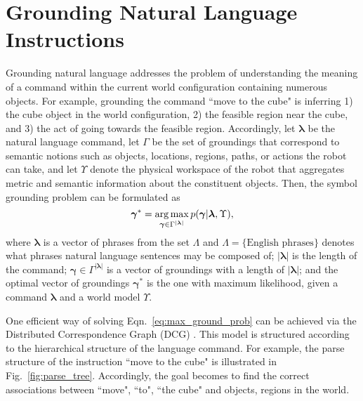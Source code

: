 \section{Grounding Natural Language Instructions}
\label{sec:background}
Grounding natural language addresses the problem of understanding the meaning of a command within the current world configuration containing numerous objects. For example, grounding the command ``move to the cube" is inferring 1) the cube object in the world configuration, 2) the feasible region near the cube, and 3) the act of going towards the feasible region. Accordingly, let $\boldsymbol{\lambda}$ be the natural language command, let $\Gamma$ be the set of groundings that correspond to semantic notions such as objects, locations, regions, paths, or actions the robot can take, and let $\Upsilon$ denote the physical workspace of the robot that aggregates metric and semantic information about the constituent objects. Then, the symbol grounding problem can be formulated as %
\begin{equation}
\boldsymbol{\gamma}^* = \operatorname*{\arg\max}_{\boldsymbol{\gamma} \in \Gamma^{|\boldsymbol{\lambda}|}} p(\boldsymbol{\gamma}|\boldsymbol{\lambda},\Upsilon),
\label{eq:max_ground_prob}
\end{equation}
where $\boldsymbol{\lambda}$ is a vector of phrases from the set $\Lambda$ and ${\Lambda = \{\text{English phrases}\}}$ denotes what phrases natural language sentences may be composed of; $|\boldsymbol{\lambda}|$ is the length of the command; $\boldsymbol{\gamma} \in \Gamma^{|\boldsymbol{\lambda}|}$ is a vector of groundings with a length of $|\boldsymbol{\lambda}|$; and the optimal vector of groundings $\boldsymbol{\gamma}^*$ is the one with maximum likelihood, given a command $\boldsymbol{\lambda}$ and a world model $\Upsilon$.

One efficient way of solving Eqn.~\eqref{eq:max_ground_prob} can be achieved via the Distributed Correspondence Graph (DCG) \cite{dcg}. This model is structured according to the hierarchical structure of the language command. For example, the parse structure of the instruction ``move to the cube" is illustrated in Fig.~\ref{fig:parse_tree}. Accordingly, the goal becomes to find the correct associations between ``move", ``to", ``the cube" and objects, regions in the world. 


